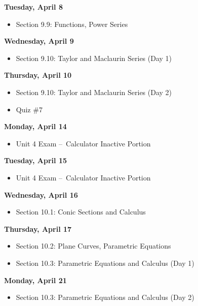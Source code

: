 \documentclass[11pt]{article}
\begin{document}
\textbf{Tuesday, April 8}

\begin{itemize}
\item Section 9.9: Functions, Power Series
\end{itemize}

\textbf{Wednesday, April 9}

\begin{itemize}
\item Section 9.10: Taylor and Maclaurin Series (Day 1)
\end{itemize}

\textbf{Thursday, April 10}

\begin{itemize}
\item Section 9.10: Taylor and Maclaurin Series (Day 2)
\item Quiz \#7
\end{itemize}

\textbf{Monday, April 14}

\begin{itemize}
\item Unit 4 Exam --~Calculator Inactive Portion
\end{itemize}

\textbf{Tuesday, April 15}

\begin{itemize}
\item Unit 4 Exam --~Calculator Inactive Portion
\end{itemize}

\textbf{Wednesday, April 16}

\begin{itemize}
\item Section 10.1: Conic Sections and Calculus
\end{itemize}

\textbf{Thursday, April 17}

\begin{itemize}
\item Section 10.2: Plane Curves, Parametric Equations
\item Section 10.3: Parametric Equations and Calculus (Day 1)
\end{itemize}

\textbf{Monday, April 21}

\begin{itemize}
\item Section 10.3: Parametric Equations and Calculus (Day 2)
\end{itemize}
\end{document}
